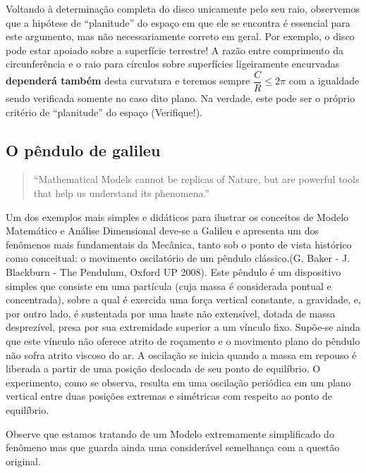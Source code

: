     Voltando à determinação completa do disco unicamente pelo seu raio, observemos que a hipótese de ``planitude'' do espaço em que ele se encontra é essencial para este argumento, mas não necessariamente correto em geral. Por exemplo, o disco pode estar apoiado sobre a superfície terrestre! A razão entre comprimento da circunferência e o raio para círculos sobre superfícies ligeiramente encurvadas \textbf{dependerá também} desta curvatura e teremos sempre \(\dfrac{C}{R} \le 2\pi\) com a igualdade sendo verificada somente no caso dito plano. Na verdade, este pode ser o próprio critério de ``planitude'' do espaço (Verifique!).



\subsection{O pêndulo de galileu}

    \begin{quote}
    ``Mathematical Models cannot be replicas of Nature, but are powerful tools that help us understand its phenomena.''
    
    \end{quote}

    Um dos exemplos mais simples e didáticos para ilustrar os conceitos de Modelo Matemático e Análise Dimensional deve-se a Galileu e apresenta um dos fenômenos mais fundamentais da Mecânica, tanto sob o ponto de vista histórico como conceitual: o movimento oscilatório de um pêndulo clássico.(G. Baker - J. Blackburn - The Pendulum, Oxford UP 2008). Este pêndulo é um dispositivo simples que consiste em uma partícula (cuja massa é considerada pontual e concentrada), sobre a qual é exercida uma força vertical constante, a gravidade, e, por outro lado, é sustentada por uma haste não extensível, dotada de massa desprezível, presa por sua extremidade superior a um vínculo fixo. Supõe-se ainda que este vínculo não oferece atrito de roçamento e o movimento plano do pêndulo não sofra atrito viscoso do ar. A oscilação se inicia quando a massa em repouso é liberada a partir de uma posição deslocada de seu ponto de equilíbrio. O experimento, como se observa, resulta em uma oscilação periódica em um plano vertical entre duas posições extremas e simétricas com respeito ao ponto de equilíbrio.

    Observe que estamos tratando de um Modelo extremamente simplificado do fenômeno mas que guarda ainda uma considerável semelhança com a questão original.

